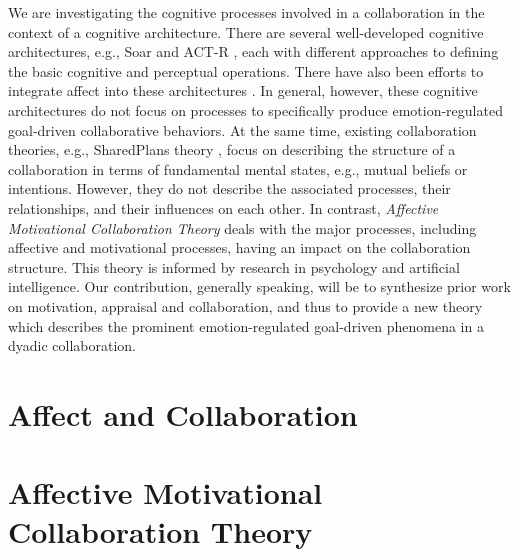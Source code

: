 \documentclass[letterpaper]{article}
\begin{document}
We are investigating the cognitive processes involved in a collaboration in the
context of a cognitive architecture. There are several well-developed cognitive
architectures, e.g., Soar \cite{laird:soar} and ACT-R \cite{anderson:act-r},
each with different approaches to defining the basic cognitive and perceptual
operations. There have also been efforts to integrate affect into these
architectures \cite{dancy:actR-physiology-affect,marinier:behavior-emotion}. In
general, however, these cognitive architectures do not focus on processes to
specifically produce emotion-regulated goal-driven collaborative behaviors. At
the same time, existing collaboration theories, e.g., SharedPlans theory
\cite{grosz:plans-discourse}, focus on describing the structure of a
collaboration in terms of fundamental mental states, e.g., mutual beliefs or
intentions. However, they do not describe the associated processes, their
relationships, and their influences on each other. In contrast,
\textit{Affective Motivational Collaboration Theory} deals with the major
processes, including affective and motivational processes, having an impact on
the collaboration structure. This theory is informed by research in psychology
and artificial intelligence. Our contribution, generally speaking, will be to
synthesize prior work on motivation, appraisal and collaboration, and thus to
provide a new theory which describes the prominent emotion-regulated goal-driven
phenomena in a dyadic collaboration.

\section{Affect and Collaboration}

\section{Affective Motivational Collaboration Theory}
\end{document}

